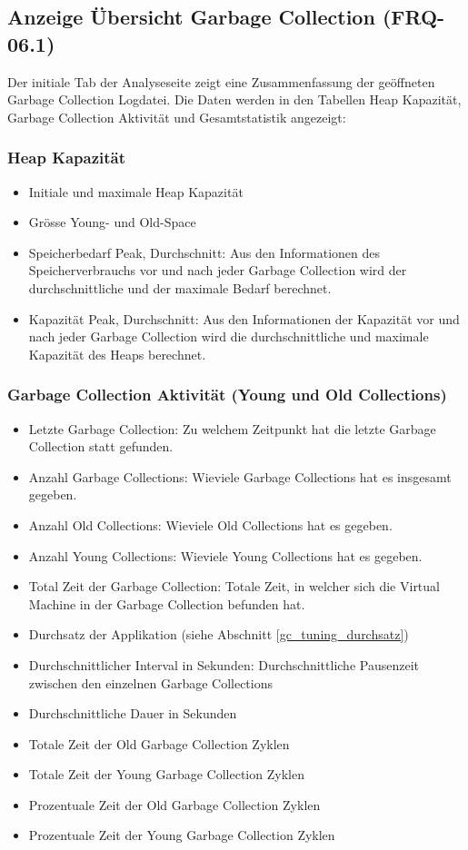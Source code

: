 \subsection{Anzeige Übersicht Garbage Collection (FRQ-06.1)}\label{standardreport}
Der initiale Tab der Analyseseite zeigt eine Zusammenfassung der geöffneten Garbage Collection Logdatei. Die Daten werden in den Tabellen Heap Kapazität, Garbage Collection Aktivität und Gesamtstatistik angezeigt:

\subsubsection{Heap Kapazität}
\begin{itemize}
	\item Initiale und maximale Heap Kapazität
	\item Grösse Young- und Old-Space
	\item Speicherbedarf Peak, Durchschnitt: Aus den Informationen des Speicherverbrauchs vor und nach jeder Garbage Collection wird der durchschnittliche und der maximale Bedarf berechnet.
	\item Kapazität Peak, Durchschnitt: Aus den Informationen der Kapazität vor und nach jeder Garbage Collection wird die durchschnittliche und maximale Kapazität des Heaps berechnet.

\end{itemize}
\subsubsection{Garbage Collection Aktivität (Young und Old Collections)}
\begin{itemize}
	\item Letzte Garbage Collection: Zu welchem Zeitpunkt hat die letzte Garbage Collection statt gefunden.
	\item Anzahl Garbage Collections: Wieviele Garbage Collections hat es insgesamt gegeben.
	\item  Anzahl Old Collections: Wieviele Old Collections hat es gegeben.
	\item Anzahl Young Collections: Wieviele Young Collections hat es gegeben.
	\item Total Zeit der Garbage Collection: Totale Zeit, in welcher sich die Virtual Machine in der Garbage Collection befunden hat.
	\item Durchsatz der Applikation (siehe Abschnitt \ref{gc_tuning_durchsatz})

	\item Durchschnittlicher Interval in Sekunden: Durchschnittliche Pausenzeit zwischen den einzelnen Garbage Collections
	\item Durchschnittliche Dauer in Sekunden
	\item Totale Zeit der Old Garbage Collection Zyklen
	\item Totale Zeit der Young Garbage Collection Zyklen
	\item Prozentuale Zeit der Old Garbage Collection Zyklen
	\item Prozentuale Zeit der Young Garbage Collection Zyklen
\end{itemize}	

